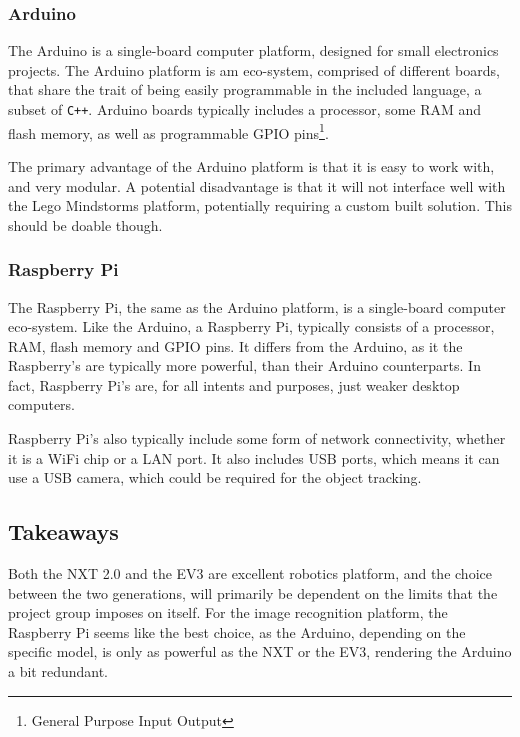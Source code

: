 \subsubsection{Arduino}
The Arduino is a single-board computer platform, designed for small electronics projects.
The Arduino platform is am eco-system, comprised of different boards, that share the trait of being easily programmable in the included language, a subset of \texttt{C++}.
Arduino boards typically includes a processor, some RAM and flash memory, as well as programmable GPIO pins\footnote{General Purpose Input Output}.

The primary advantage of the Arduino platform is that it is easy to work with, and very modular.
A potential disadvantage is that it will not interface well with the Lego Mindstorms platform, potentially requiring a custom built solution.
This should be doable though.

\subsubsection{Raspberry Pi}
The Raspberry Pi, the same as the Arduino platform, is a single-board computer eco-system.
Like the Arduino, a Raspberry Pi, typically consists of a processor, RAM, flash memory and GPIO pins.
It differs from the Arduino, as it the Raspberry's are typically more powerful, than their Arduino counterparts.
In fact, Raspberry Pi's are, for all intents and purposes, just weaker desktop computers.

Raspberry Pi's also typically include some form of network connectivity, whether it is a WiFi chip or a LAN port.
It also includes USB ports, which means it can use a USB camera, which could be required for the object tracking.

\subsection{Takeaways}
Both the NXT 2.0 and the EV3 are excellent robotics platform, and the choice between the two generations, will primarily be dependent on the limits that the project group imposes on itself.
For the image recognition platform, the Raspberry Pi seems like the best choice, as the Arduino, depending on the specific model, is only as powerful as the NXT or the EV3, rendering the Arduino a bit redundant.
